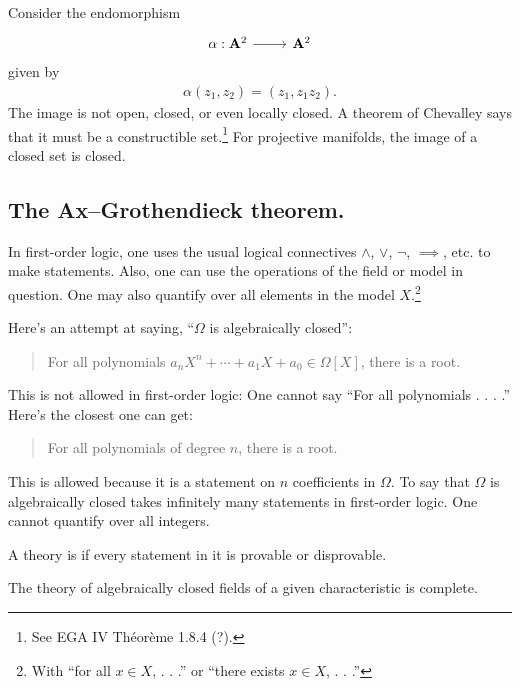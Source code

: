 \documentclass [11 pt, oneside] {article}
\begin{document}
\begin{example}\label{}
Consider the endomorphism 
\[
\begin{tikzcd}
\alpha:\mathbf{A}^2\ar[r]& \mathbf{A}^2
\end{tikzcd}
\]
given by
\begin{align*}
	\alpha(z_1,z_2)=  (z_1,z_1z_2).
\end{align*}
The image is not open, closed, or even locally closed. A theorem of Chevalley says that it must be a constructible set.\footnote{See EGA IV Th\'eor\`eme 1.8.4 (?).} For projective manifolds, the image of a closed set is closed.
\end{example}

\subsection{The Ax--Grothendieck theorem.}
\begin{remark}
 In first-order logic, one uses the usual logical connectives $\land$, $\lor$, $\lnot$, ${\implies}$, etc. to make statements. Also, one can use the operations of the field or model in question. One may also quantify over all elements in the model $X$.\footnote{With ``for all $x\in X$, . . .'' or ``there exists $x\in X$, . . .''}

	Here's an attempt at saying, ``$\Omega$ is algebraically closed'':
	\begin{quote}
		\small 
		For all polynomials $a_nX^n + \cdots + a_1X + a_0\in \Omega[X]$, there is a root.
	\end{quote}
	This is not allowed in first-order logic: One cannot say ``For all polynomials . . . .'' Here's the closest one can get:
	\begin{quote}
		\small 
		For all polynomials of degree $n$, there is a root.
	\end{quote}
	This is allowed because it is a statement on $n$ coefficients in $\Omega$. To say that $\Omega$ is algebraically closed takes infinitely many statements in first-order logic. One cannot quantify over all integers.
\end{remark}
\begin{definition}[ ]\label{}
A theory is  if every statement in it is provable or disprovable.
\end{definition}

\begin{proposition}[ ]\label{}
The theory of algebraically closed fields of a given characteristic is complete.
\end{proposition}
\end{document}
